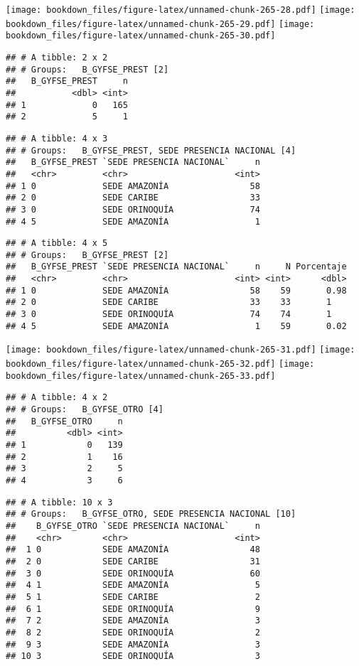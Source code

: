 \documentclass[]{article}
\theoremstyle{definition}
\theoremstyle{definition}
\theoremstyle{definition}
\theoremstyle{remark}
\begin{document}
\texttt{[image: bookdown\_files/figure-latex/unnamed-chunk-265-28.pdf]}
\texttt{[image: bookdown\_files/figure-latex/unnamed-chunk-265-29.pdf]}
\texttt{[image: bookdown\_files/figure-latex/unnamed-chunk-265-30.pdf]}

\begin{verbatim}
## # A tibble: 2 x 2
## # Groups:   B_GYFSE_PREST [2]
##   B_GYFSE_PREST     n
##           <dbl> <int>
## 1             0   165
## 2             5     1
\end{verbatim}

\begin{verbatim}
## # A tibble: 4 x 3
## # Groups:   B_GYFSE_PREST, SEDE PRESENCIA NACIONAL [4]
##   B_GYFSE_PREST `SEDE PRESENCIA NACIONAL`     n
##   <chr>         <chr>                     <int>
## 1 0             SEDE AMAZONÍA                58
## 2 0             SEDE CARIBE                  33
## 3 0             SEDE ORINOQUÍA               74
## 4 5             SEDE AMAZONÍA                 1
\end{verbatim}

\begin{verbatim}
## # A tibble: 4 x 5
## # Groups:   B_GYFSE_PREST [2]
##   B_GYFSE_PREST `SEDE PRESENCIA NACIONAL`     n     N Porcentaje
##   <chr>         <chr>                     <int> <int>      <dbl>
## 1 0             SEDE AMAZONÍA                58    59       0.98
## 2 0             SEDE CARIBE                  33    33       1   
## 3 0             SEDE ORINOQUÍA               74    74       1   
## 4 5             SEDE AMAZONÍA                 1    59       0.02
\end{verbatim}

\texttt{[image: bookdown\_files/figure-latex/unnamed-chunk-265-31.pdf]}
\texttt{[image: bookdown\_files/figure-latex/unnamed-chunk-265-32.pdf]}
\texttt{[image: bookdown\_files/figure-latex/unnamed-chunk-265-33.pdf]}

\begin{verbatim}
## # A tibble: 4 x 2
## # Groups:   B_GYFSE_OTRO [4]
##   B_GYFSE_OTRO     n
##          <dbl> <int>
## 1            0   139
## 2            1    16
## 3            2     5
## 4            3     6
\end{verbatim}

\begin{verbatim}
## # A tibble: 10 x 3
## # Groups:   B_GYFSE_OTRO, SEDE PRESENCIA NACIONAL [10]
##    B_GYFSE_OTRO `SEDE PRESENCIA NACIONAL`     n
##    <chr>        <chr>                     <int>
##  1 0            SEDE AMAZONÍA                48
##  2 0            SEDE CARIBE                  31
##  3 0            SEDE ORINOQUÍA               60
##  4 1            SEDE AMAZONÍA                 5
##  5 1            SEDE CARIBE                   2
##  6 1            SEDE ORINOQUÍA                9
##  7 2            SEDE AMAZONÍA                 3
##  8 2            SEDE ORINOQUÍA                2
##  9 3            SEDE AMAZONÍA                 3
## 10 3            SEDE ORINOQUÍA                3
\end{verbatim}
\end{document}
